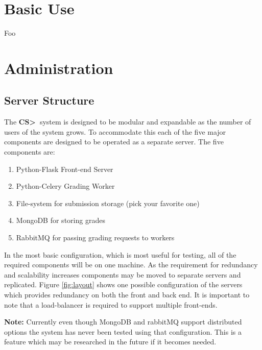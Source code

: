 \documentclass[11pt]{report}
\newcommand{\csgt}[0]{\textbf{CS\textgreater\ }}
\begin{document}
\chapter{Basic Use}
\label{ch:use}
Foo

\chapter{Administration}
\label{ch:admin}
\section{Server Structure}
The \csgt system is designed to be modular and expandable as the number of users of the system grows. 
To accommodate this each of the five major components are designed to be operated as a separate server. 
The five components are:

\begin{enumerate}
\item Python-Flask Front-end Server
\item Python-Celery Grading Worker
\item File-system for submission storage (pick your favorite one)
\item MongoDB for storing grades
\item RabbitMQ for passing grading requests to workers
\end{enumerate}

In the most basic configuration, which is most useful for testing, all of the required components will be 
on one machine. As the requirement for redundancy and scalability increases components may be moved to 
separate servers and replicated. Figure \ref{fig:layout} shows one possible configuration of the servers
which provides redundancy on both the front and back end. It is important to note that a load-balancer is
required to support multiple front-ends.

\textbf{Note:} Currently even though MongoDB and rabbitMQ support distributed options the system has never 
been tested using that configuration. This is a feature which may be researched in the future if it becomes
needed.
\end{document}
